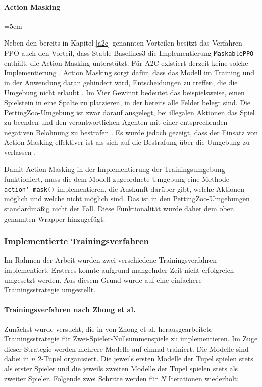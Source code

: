 \paragraph{Action Masking}

\begingroup
\emergencystretch=5em

Neben den bereits in Kapitel \ref{a2c} genannten Vorteilen besitzt das Verfahren PPO auch den Vorteil, dass Stable Baselines3 die Implementierung \texttt{MaskablePPO} enthält, die Action Masking unterstützt. Für A2C existiert derzeit keine solche Implementierung \cite{Raffin.2021}. Action Masking sorgt dafür, dass das Modell im Training und in der Anwendung daran gehindert wird, Entscheidungen zu treffen, die die Umgebung nicht erlaubt \cite{Huang_2022}. Im Vier Gewinnt bedeutet das beispielsweise, einen Spielstein in eine Spalte zu platzieren, in der bereits alle Felder belegt sind. Die PettingZoo-Umgebung ist zwar darauf ausgelegt, bei illegalen Aktionen das Spiel zu beenden und den verantwortlichen Agenten mit einer entsprechenden negativen Belohnung zu bestrafen \cite{Farama.2025}. Es wurde jedoch gezeigt, dass der Einsatz von Action Masking effektiver ist als sich auf die Bestrafung über die Umgebung zu verlassen \cite{Huang_2022}.

\endgroup

Damit Action Masking in der Implementierung der Trainingsumgebung funktioniert, muss die dem Modell zugeordnete Umgebung eine Methode \texttt{action\char`_mask()} implementieren, die Auskunft darüber gibt, welche Aktionen möglich und welche nicht möglich sind. Das ist in den PettingZoo-Umgebungen standardmäßig nicht der Fall. Diese Funktionalität wurde daher dem oben genannten Wrapper hinzugefügt.

\subsubsection{Implementierte Trainingsverfahren}

Im Rahmen der Arbeit wurden zwei verschiedene Trainingsverfahren implementiert. Ersteres konnte aufgrund mangelnder Zeit nicht erfolgreich umgesetzt werden. Aus diesem Grund wurde auf eine einfachere Trainingsstrategie umgestellt.

\paragraph{Trainingsverfahren nach Zhong et al.}

Zunächst wurde versucht, die in \cite{Zhong.2020} von Zhong et al. herausgearbeitete Trainingsstrategie für Zwei-Spieler-Nullsummenspiele zu implementieren. Im Zuge dieser Strategie werden mehrere Modelle auf einmal trainiert. Die Modelle sind dabei in $n$ 2-Tupel organisiert. Die jeweils ersten Modelle der Tupel spielen stets als erster Spieler und die jeweils zweiten Modelle der Tupel spielen stets als zweiter Spieler. Folgende zwei Schritte werden für $N$ Iterationen wiederholt:

